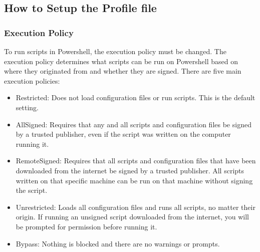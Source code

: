 \documentclass[a4paper,12pt]{report}
\begin{document}
\subsection*{How to Setup the Profile file}
 \par
\subsubsection*{Execution Policy}
 \par
To run scripts in Powershell, the execution policy must be changed. The execution policy determines what scripts can be run on Powershell based on where they originated from and whether they are signed. There are five main execution policies: \par
\begin{itemize}
\item Restricted: Does not load configuration files or run scripts. This is the default setting. \par
\item AllSigned: Requires that any and all scripts and configuration files be signed by a trusted publisher, even if the script was written on the computer running it. \par
\item RemoteSigned: Requires that all scripts and configuration files that have been downloaded from the internet be signed by a trusted publisher. All scripts written on that specific machine can be run on that machine without signing the script. \par
\item Unrestricted: Loads all configuration files and runs all scripts, no matter their origin. If running an unsigned script downloaded from the internet, you will be prompted for permission before running it. \par
\item Bypass: Nothing is blocked and there are no warnings or prompts. \par
\end{itemize}
\end{document}
